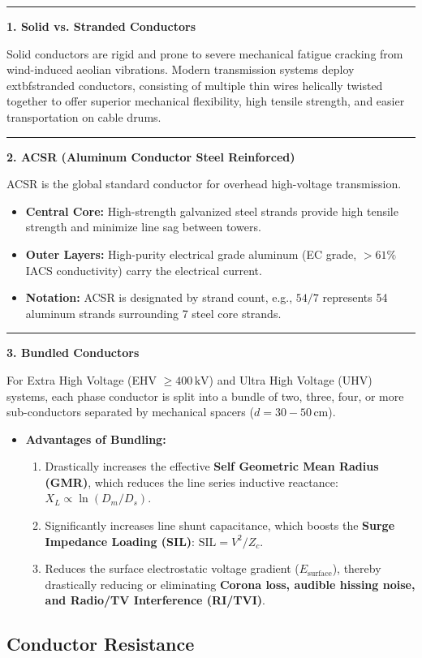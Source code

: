 \documentclass[11pt,a4paper]{article}
\newcommand{\concept}[1]{%
  \vspace{3pt}\noindent\textcolor{AnthGreen}{\rule{3.5pt}{10pt}}\enspace
  \textbf{\sffamily\color{AnthDark}#1}\par\vspace{2pt}%
}
\begin{document}
\concept{1. Solid vs. Stranded Conductors}
Solid conductors are rigid and prone to severe mechanical fatigue cracking from wind-induced aeolian vibrations. Modern transmission systems deploy 	extbf{stranded conductors}, consisting of multiple thin wires helically twisted together to offer superior mechanical flexibility, high tensile strength, and easier transportation on cable drums.

\concept{2. ACSR (Aluminum Conductor Steel Reinforced)}
ACSR is the global standard conductor for overhead high-voltage transmission.
\begin{itemize}
  \item \textbf{Central Core:} High-strength galvanized steel strands provide high tensile strength and minimize line sag between towers.
  \item \textbf{Outer Layers:} High-purity electrical grade aluminum (EC grade, $>61\%$ IACS conductivity) carry the electrical current.
  \item \textbf{Notation:} ACSR is designated by strand count, e.g., $54/7$ represents 54 aluminum strands surrounding 7 steel core strands.
\end{itemize}

\concept{3. Bundled Conductors}
For Extra High Voltage (EHV $\ge 400\,\text{kV}$) and Ultra High Voltage (UHV) systems, each phase conductor is split into a bundle of two, three, four, or more sub-conductors separated by mechanical spacers ($d = 30-50\,\text{cm}$).
\begin{itemize}
  \item \textbf{Advantages of Bundling:}
    \begin{enumerate}
      \item Drastically increases the effective \textbf{Self Geometric Mean Radius (GMR)}, which reduces the line series inductive reactance: $X_L \propto \ln(D_m / D_s)$.
      \item Significantly increases line shunt capacitance, which boosts the \textbf{Surge Impedance Loading (SIL)}: $\text{SIL} = V^2 / Z_c$.
      \item Reduces the surface electrostatic voltage gradient ($E_{\text{surface}}$), thereby drastically reducing or eliminating \textbf{Corona loss, audible hissing noise, and Radio/TV Interference (RI/TVI)}.
    \end{enumerate}
\end{itemize}

\subsection{Conductor Resistance}
\end{document}
